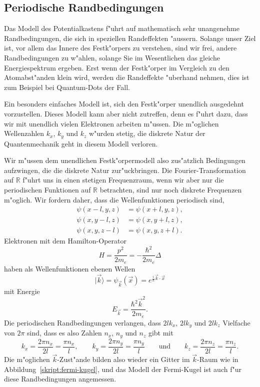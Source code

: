 
\subsection{Periodische Randbedingungen}
Das Modell des Potentialkastens f"uhrt auf mathematisch sehr unangenehme
Randbedingungen, die sich in speziellen Randeffekten "aussern.
Solange unser Ziel ist, vor allem das Innere des Festk"orpers zu verstehen,
sind wir frei, andere Randbedingungen zu w"ahlen, solange Sie im Wesentlichen
das gleiche Energiespektrum ergeben. Erst wenn der Festk"orper im Vergleich
zu den Atomabst"anden klein wird, werden die Randeffekte "uberhand nehmen,
dies ist zum Beispiel bei Quantum-Dots der Fall. 

Ein besonders einfaches Modell ist, sich den Festk"orper unendlich 
ausgedehnt vorzustellen. Dieses Modell kann aber nicht zutreffen, denn
es f"uhrt dazu, dass wir mit unendlich vielen Elektronen arbeiten m"ussen.
Die m"oglichen Wellenzahlen $k_x$, $k_y$ und $k_z$ w"urden stetig, die
diskrete Natur der Quantenmechanik geht in diesem Modell verloren.

Wir m"ussen dem unendlichen Festk"orpermodell also zus"atzlich Bedingungen
aufzwingen, die die diskrete Natur zur"uckbringen. Die Fourier-Transformation
auf $\mathbb R$ f"uhrt uns in einen stetigen Frequenzraum, wenn wir
aber nur die periodischen Funktionen auf $\mathbb R$ betrachten, sind
nur noch diskrete Frequenzen m"oglich.
Wir fordern daher, dass die Wellenfunktionen periodisch sind,
\begin{align*}
\psi(x-l, y  ,z  )&=\psi(x+l,y  ,z  ),
\\
\psi(x  , y-l,z  )&=\psi(x  ,y+l,z  ),
\\
\psi(x  , y  ,z-l)&=\psi(x  ,y  ,z+l).
\end{align*}
Elektronen mit dem Hamilton-Operator 
\[
H=\frac{p^2}{2m_e}=-\frac{\hbar^2}{2m_e}\Delta
\]
haben als Wellenfunktionen ebenen Wellen
\[
|\vec k\rangle
=
\psi_{\vec k}(\vec x)
=
e^{\frac{i}{\hbar}\vec k\cdot \vec x}
\]
mit Energie
\[
E_{\vec k}=\frac{\hbar^2\vec k^2}{2m_e}.
\]
Die periodischen Randbedingungen verlangen, dass $2l k_x$, $2lk_y$ und $2lk_z$
Vielfache von $2\pi$ sind, dass es also Zahlen $n_x$, $n_y$ und $n_z$ gibt mit
\[
k_x=\frac{2\pi n_x}{2l}=\frac{\pi n_x}{l},\qquad
k_y=\frac{2\pi n_y}{2l}=\frac{\pi n_y}{l}\qquad\text{und}\qquad
k_z=\frac{2\pi n_z}{2l}=\frac{\pi n_z}{l}.
\]
Die m"oglichen $\vec k$-Zust"ande bilden also wieder ein Gitter im
$\vec k$-Raum wie in Abbildung~\ref{skript:fermi-kugel}, und das Modell
der Fermi-Kugel ist auch f"ur diese Randbedingungen angemessen.

